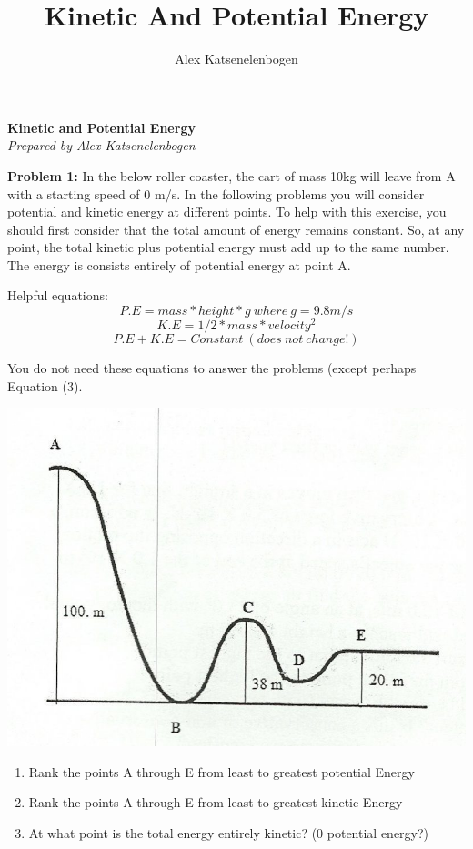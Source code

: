 \documentclass{article}
\title{Kinetic And Potential Energy}
\author{Alex Katsenelenbogen}
\begin{document}
\begin{center}
      \Large\textbf{Kinetic and Potential Energy}\\
      \large\textit{Prepared by Alex Katsenelenbogen}
 \end{center}
 
 
\textbf{Problem 1:}
In the below roller coaster, the cart of mass 10kg will leave from A with a starting speed of 0 m/s. In the following problems you will consider potential and kinetic energy at different points.
To help with this exercise, you should first consider that the total amount of energy remains constant. So, at any point, the total kinetic plus potential energy must add up to the same number. The energy is consists entirely of potential energy at point A. 

Helpful equations:
\begin{equation}
P.E = mass * height * g \ where \ g = 9.8 m/s
\end{equation}
\begin{equation}
K.E = 1/2 * mass * velocity ^2
\end{equation}
\begin{equation}
P.E + K.E = Constant\  (does\  not\  change!)
\end{equation}

You do not need these equations to answer the problems (except perhaps Equation (3).

\begin{center}
\includegraphics[scale=0.4]{roller-coaster}
\end{center}
\begin{enumerate}
\item Rank the points A through E from least to greatest potential Energy
\item Rank the points A through E from least to greatest kinetic Energy
\item At what point is the total energy entirely kinetic? (0 potential energy?)
\end{enumerate}
\end{document}
